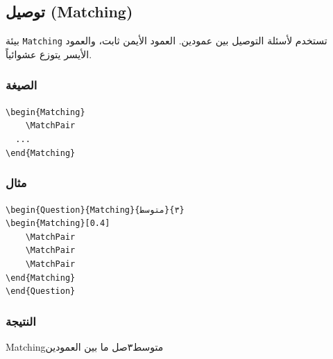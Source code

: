 \documentclass[a4paper]{article}
\newcommand{\engtt}[1]{\textenglish{\texttt{#1}}}
\begin{document}
\subsection{توصيل (Matching)}

بيئة \engtt{Matching} تستخدم لأسئلة التوصيل بين عمودين. العمود الأيمن ثابت، والعمود الأيسر يتوزع عشوائياً.

\subsubsection*{الصيغة}

\begin{LTR}\ttfamily
\verb|\begin{Matching}|\\
\verb|    \MatchPair|\\
\verb|  ...|\\
\verb|\end{Matching}|
\end{LTR}

\subsubsection*{مثال}

\begin{LTR}\ttfamily
\verb|\begin{Question}{Matching}{متوسط}{٣}|\\
\verb|\begin{Matching}[0.4]|\\
\verb|    \MatchPair|\\
\verb|    \MatchPair|\\
\verb|    \MatchPair|\\
\verb|\end{Matching}|\\
\verb|\end{Question}|
\end{LTR}

\subsubsection*{النتيجة}

\begin{Question}{Matching}{متوسط}{٣}{صل ما بين العمودين}
\begin{Matching}[0.4]
\end{Matching}
\end{Question}
\end{document}
